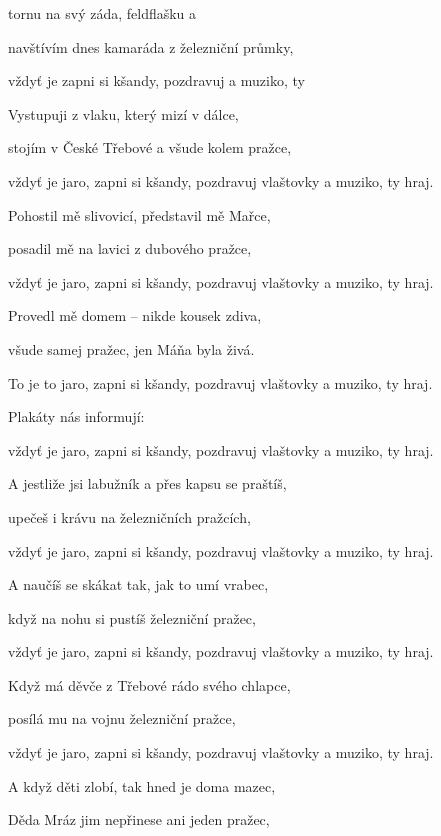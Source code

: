 

\zs
{} tornu na svý záda, feldflašku a 

navštívím dnes kamaráda z železniční průmky,

vždyť je  zapni si kšandy,
pozdravuj  a muziko, ty 
\ks

\zs
Vystupuji z vlaku, který mizí v dálce,

stojím v České Třebové a všude kolem pražce,

vždyť je jaro, zapni si kšandy,
pozdravuj vlaštovky a muziko, ty hraj.
\ks

\zs
Pohostil mě slivovicí, představil mě Mařce,

posadil mě na lavici z dubového pražce,

vždyť je jaro, zapni si kšandy,
pozdravuj vlaštovky a muziko, ty hraj.
\ks

\zs
Provedl mě domem -- nikde kousek zdiva,

všude samej pražec, jen Máňa byla živá.

To je to jaro, zapni si kšandy,
pozdravuj vlaštovky a muziko, ty hraj.
\ks

\zs
Plakáty nás informují: 

vždyť je jaro, zapni si kšandy,
pozdravuj vlaštovky a muziko, ty hraj.
\ks

\zs
A jestliže jsi labužník a přes kapsu se praštíš,

upečeš i krávu na železničních pražcích,

vždyť je jaro, zapni si kšandy,
pozdravuj vlaštovky a muziko, ty hraj.
\ks

\zs
A naučíš se skákat tak, jak to umí vrabec,

když na nohu si pustíš železniční pražec,

vždyť je jaro, zapni si kšandy,
pozdravuj vlaštovky a muziko, ty hraj.
\ks

\zs
Když má děvče z Třebové rádo svého chlapce,

posílá mu na vojnu železniční pražce,

vždyť je jaro, zapni si kšandy,
pozdravuj vlaštovky a muziko, ty hraj.
\ks

\zs
A když děti zlobí, tak hned je doma mazec,

Děda Mráz jim nepřinese ani jeden pražec,

